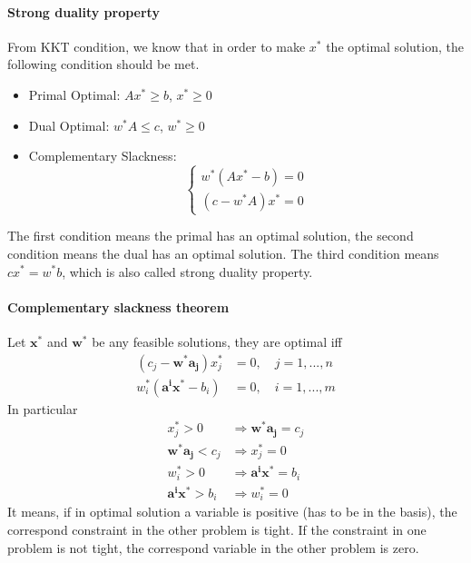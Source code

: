                 \paragraph{Strong duality property}
                    From KKT condition, we know that in order to make $x^*$ the optimal solution, the following condition should be met.
                    \begin{itemize}
                        \item Primal Optimal: $Ax^* \ge b$, $x^*\ge 0$
                        \item Dual Optimal: $w^*A \le c$, $w^*\ge 0$
                        \item Complementary Slackness:
                    \begin{equation}
                        \begin{cases}
                            w^*(Ax^*-b) = 0\\
                            (c-w^*A)x^* = 0
                        \end{cases} \nonumber
                    \end{equation}
                    \end{itemize}
                    The first condition means the primal has an optimal solution, the second condition means the dual has an optimal solution. The third condition means $cx^*=w^*b$, which is also called strong duality property.

                \paragraph{Complementary slackness theorem}
                    Let $\bm{x^*}$ and $\bm{w^*}$ be any feasible solutions, they are optimal iff
                    \begin{align}
                        (c_j - \bm{w^*}\bm{a_j})x_j^* &= 0, \quad j = 1,...,n\nonumber \\
                        w_i^*(\bm{a^i}\bm{x^*} - b_i) &= 0, \quad i = 1,...,m\nonumber
                    \end{align}
                    In particular
                    \begin{align}
                        x_j^*>0 &\Rightarrow \bm{w^*}\bm{a_j} = c_j \nonumber \\
                        \bm{w^*}\bm{a_j} < c_j &\Rightarrow x_j^* = 0 \nonumber \\
                        w_i^* >0 &\Rightarrow \bm{a^i}\bm{x^*} = b_i \nonumber \\
                        \bm{a^i}\bm{x^*} > b_i &\Rightarrow w_i^*=0\nonumber
                    \end{align}
                    It means, if in optimal solution a variable is positive (has to be in the basis), the correspond constraint in the other problem is tight. If the constraint in one problem is not tight, the correspond variable in the other problem is zero.

